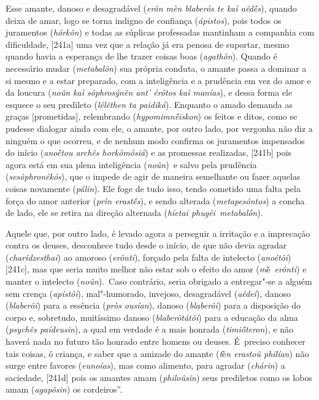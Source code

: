 Esse amante, danoso e desagradável (\emph{erôn mèn blaberós te kaì
aêdḗs}), quando deixa de amar, logo se torna indigno de confiança
(\emph{ápistos}), pois todos os juramentos (\emph{hórkôn}) e todas as
súplicas professadas mantinham a companhia com dificuldade, [241a]
uma vez que a relação já era penosa de suportar, mesmo quando havia a
esperança de lhe trazer coisas boas (\emph{agathôn}). Quando é
necessário mudar (\emph{metabalôn}) sua própria conduta, o amante passa
a dominar a si mesmo e a estar preparado, com a inteligência e a
prudência em vez do amor e da loucura (\emph{noûn kaì sôphrosýnên ant'
érôtos kaì manías}), e dessa forma ele esquece o seu predileto
(\emph{lélêthen ta paidiká}). Enquanto o amado demanda as graças
[prometidas], relembrando (\emph{hypomimnḗiskon}) os feitos e ditos,
como se pudesse dialogar ainda com ele, o amante, por outro lado, por
vergonha não diz a ninguém o que ocorreu, e de nenhum modo confirma os
juramentos impensados do início (\emph{anoḗtou archês horkômósiá}) e as
promessas realizadas, [241b] pois agora está em sua plena
inteligência (\emph{noûn})~e salvo pela prudência
(\emph{sesôphronêkós}), que o impede de agir de maneira semelhante ou
fazer aquelas coisas novamente (\emph{pálin}). Ele foge de tudo isso,
tendo cometido uma falta pela força do amor anterior (\emph{prìn
erastḗs}), e sendo alterada (\emph{metapesóntos}) a concha de lado, ele
se retira na direção alternada (\emph{híetai phugêi~metabalṓn}).

Aquele que, por outro lado, é levado agora a perseguir a irritação e a
imprecação contra os deuses, desconhece tudo desde o início, de que não
devia agradar (\emph{charídzesthai}) ao amoroso (\emph{erônti}), forçado
pela falta de intelecto (\emph{anoétôi}) [241c], mas que seria muito
melhor não estar sob o efeito do amor (\emph{m}ḕ~\emph{erônti}) e manter
o intelecto (\emph{noûn}).~Caso contrário, seria obrigado a entregar"-se
a alguém sem crença (\emph{apístôi}), mal"-humorado, invejoso,
desagradável (\emph{aêdeî}), danoso (\emph{blaberôi}) para a essência
(\emph{pròs ousían}), danoso (\emph{blaberôi}) para a disposição do
corpo e, sobretudo, muitíssimo danoso (\emph{blaberôtátôi}) para a
educação da alma (\emph{psychês paídeusin}), a qual em verdade é a mais
honrada (\emph{timiṓteron}), e não haverá nada no futuro tão honrado
entre homens ou deuses. É~preciso conhecer tais coisas, ó criança, e
saber que a amizade do amante (\emph{t}ḕ\emph{n erastoû philían}) não
surge entre favores (\emph{eunoías}), mas como alimento, para agradar
(\emph{chárin}) a saciedade, [241d] pois os amantes amam
(\emph{philoûsin}) seus prediletos como os lobos amam (\emph{agapôsin})
os cordeiros''.

